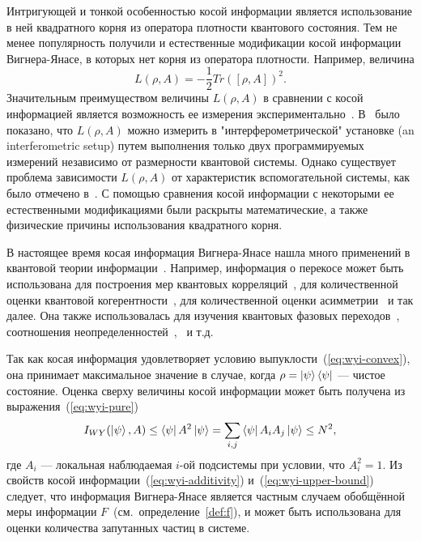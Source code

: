 Интригующей и тонкой особенностью косой информации является использование в ней квадратного корня из оператора плотности квантового состояния.
Тем не менее популярность получили и естественные модификации косой информации Вигнера-Янасе,
в которых нет корня из оператора плотности.
Например, величина
%
\begin{equation}\label{eq:wyi-modification-l}
  L(\rho, A)
  = -\frac{1}{2} Tr([\rho, A])^2.
\end{equation}
%
Значительным преимуществом величины $L(\rho, A)$ в сравнении с косой информацией является возможность ее измерения экспериментально~\cite{Girolami2014}.
В~\cite{Karpat2014} было показано,
что $L(\rho, A)$ можно измерить в "интерферометрической" установке (an interferometric setup) путем выполнения только двух программируемых измерений независимо от размерности квантовой системы.
Однако существует проблема зависимости $L(\rho, A)$ от характеристик вспомогательной системы, как было отмечено в~\cite{Yadin2016}.
С помощью сравнения косой информации с некоторыми ее естественными модификациями были раскрыты\cite{Luo2020} математические,
а также физические причины использования квадратного корня.

В настоящее время косая информация Вигнера-Янасе нашла много применений в квантовой теории информации~\cite{Wigner1963, Luo2017}.
Например, информация о перекосе может быть использована для построения мер квантовых корреляций~\cite{Luo2005, Luo2012, Li2016a, Sun2017},
для количественной оценки квантовой когерентности~\cite{Girolami2014, Yu2017, Luo2017, Luo2018},
для количественной оценки асимметрии~\cite{Luo2018} и так далее.
Она также использовалась для изучения квантовых фазовых переходов~\cite{Karpat2014, Malvezzi2016, Li2016b, Lei2016, Qiu2017}, соотношения неопределенностей~\cite{Luo2005},~\cite{Yanagi2005, Furuichi2010, Chen2016} и т.д.

Так как косая информация удовлетворяет условию выпуклости~(\ref{eq:wyi-convex}),
она принимает максимальное значение в случае,
когда $\rho = \left| \psi \right\rangle\left\langle \psi \right|$ --- чистое состояние.
Оценка сверху величины косой информации может быть получена из выражения~(\ref{eq:wyi-pure})
%
\begin{equation}\label{eq:wyi-upper-bound}
  I_{WY}(\left| \psi \right\rangle, A)
  \leq  \left\langle \psi \right| A^2 \left| \psi \right\rangle
  = \sum\limits_{i, j} \left\langle \psi \right| A_i A_j \left| \psi \right\rangle
  \leq N^2,
\end{equation}
%
где $A_i$ --- локальная наблюдаемая $i$-ой подсистемы при условии,
что $A_i^2 = 1$.
Из свойств косой информации~(\ref{eq:wyi-additivity}) и~(\ref{eq:wyi-upper-bound}) следует,
что информация Вигнера-Янасе является частным
случаем обобщённой меры информации $F$~(см.~определение~\ref{def:f}),
и может быть использована для оценки количества запутанных частиц в системе.


